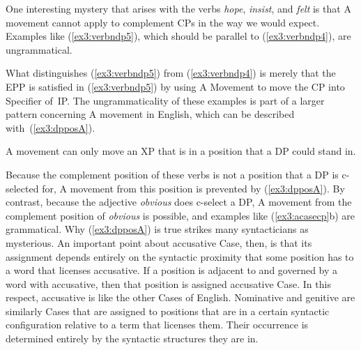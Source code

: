 One interesting mystery that arises with the verbs \emph{hope}, \emph{insist}, and \emph{felt} is that A movement cannot apply to complement CPs in the way we would expect. Examples like (\ref{ex3:verbndp5}), which should be parallel to (\ref{ex3:verbndp4}), are ungrammatical.
\enlargethispage*{\baselineskip}
\begin{exe}
	\raggedright
	\ex \label{ex3:verbndp5} 
	\begin{xlist}
	\end{xlist}
\end{exe}
What distinguishes (\ref{ex3:verbndp5}) from (\ref{ex3:verbndp4}) is merely that the EPP is satisfied in (\ref{ex3:verbndp5}) by using A Movement to move the CP into Specifier of~IP. The ungrammaticality of these examples is part of a larger pattern concerning A movement in English, which can be described with~(\ref{ex3:dpposA}).
\begin{exe}
	\raggedright
	\ex \label{ex3:dpposA} 
	A movement can only move an XP that is in a position that a DP could stand in.
\end{exe}
Because the complement position of these verbs is not a position that a DP is c-selected for, A movement from this position is prevented by (\ref{ex3:dpposA}). By contrast, because the adjective \emph{obvious} does c-select a DP, A movement from the complement position of \emph{obvious} is possible, and examples like (\ref{ex3:acasecp}b) are grammatical. Why (\ref{ex3:dpposA}) is true strikes many syntacticians as mysterious. %
%
%
%
An important point about accusative Case, then, is that its assignment depends entirely on the syntactic proximity that some position has to a word that licenses accusative. If a position is adjacent to and governed by a word with accusative, then that position is assigned accusative Case. In this respect, accusative is like the other Cases of English. Nominative and genitive are similarly Cases that are assigned to positions that are in a certain syntactic configuration relative to a term that licenses them. Their occurrence is determined entirely by the syntactic structures they are in.

